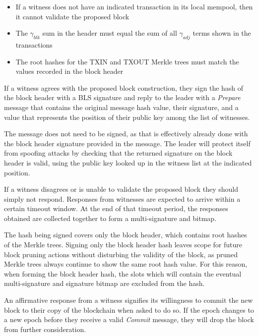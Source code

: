 \documentclass[a4paper, 10pt, conference]{ieeeconf}
\begin{document}
\begin{itemize}
{\begin{itemize}
			\item {If a witness does not have an indicated transaction in its local mempool, then it cannot validate the proposed block}
			\item {The $\gamma_{blk}$ sum in the header must equal the sum of all $\gamma_{adj}$ terms shown in the transactions}
			\item {The root hashes for the TXIN and TXOUT Merkle trees must match the values recorded in the block header}
		\end{itemize}

	\item{If a witness agrees with the proposed block construction, they sign the hash of the block header with a BLS signature and reply to the leader with a \textit{Prepare} message that contains the original message hash value, their signature, and a value that represents the position of their public key among the list of witnesses. 

	The message does not need to be signed, as that is effectively already done with the block header signature provided in the message. The leader will protect itself from spoofing attacks by checking that the returned signature on the block header is valid, using the public key looked up in the witness list at the indicated position.}

	\item{If a witness disagrees or is unable to validate the proposed block they should simply not respond. Responses from witnesses are expected to arrive within a certain timeout window. At the end of that timeout period, the responses obtained are collected together to form a multi-signature and bitmap.}

	\item{The hash being signed covers only the block header, which contains root hashes of the Merkle trees. Signing only the block header hash leaves scope for future block pruning actions without disturbing the validity of the block, as pruned Merkle trees always continue to show the same root hash value. For this reason, when forming the block header hash, the slots which will contain the eventual multi-signature and signature bitmap are excluded from the hash.}

	\item{An affirmative response from a witness signifies its willingness to commit the new block to their copy of the blockchain when asked to do so. If the epoch changes to a new epoch before they receive a valid \textit{Commit} message, they will drop the block from further consideration.} 

}
\end{itemize}
\end{document}

